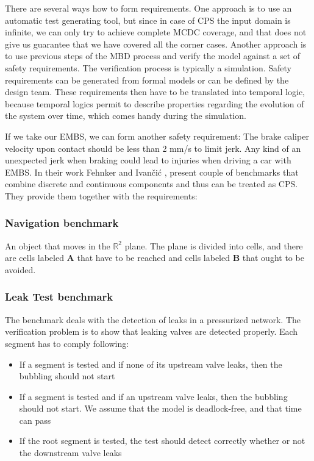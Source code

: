 There are several ways how to form requirements. One approach is to use an automatic test generating tool, but since in case of CPS the input domain is infinite, we can only try to achieve complete MCDC coverage, and that does not give us guarantee that we have covered all the corner cases. Another approach is to use previous steps of the MBD process and verify the model against a set of safety requirements. The verification process is typically a simulation. Safety requirements can be generated from formal models or can be defined by the design team. These requirements then have to be translated into temporal logic, because temporal logics permit to describe properties regarding the evolution of the system over time, which comes handy during the simulation.

If we take our EMBS, we can form another safety requirement: The brake caliper velocity upon contact should be less than 2 mm/s to limit jerk. Any kind of an unexpected jerk when braking could lead to injuries when driving a car with EMBS. In their work Fehnker and Ivančić \cite{Fehnker:BenchmarksHybridSystems}, present couple of benchmarks that combine discrete and continuous components and thus can be treated as CPS. They provide them together with the requirements:

\subsubsection{Navigation benchmark}

An object that moves in the ${\mathbb{R}}^2$ plane. The plane is divided into cells, and there are cells labeled \textbf{A} that have to be reached and cells labeled \textbf{B} that ought to be avoided.

\subsubsection{Leak Test benchmark}

The benchmark deals with the detection of leaks in a pressurized network. The verification problem is to show that leaking valves are detected properly. Each segment has to comply following:

\begin{itemize}
    \item If a segment is tested and if none of its upstream valve leaks, then the bubbling should not start
    \item If a segment is tested and if an upstream valve leaks, then the bubbling should not start. We assume that the model is deadlock-free, and that time can pass
    \item If the root segment is tested, the test should detect correctly whether or not the downstream valve leaks
\end{itemize}

